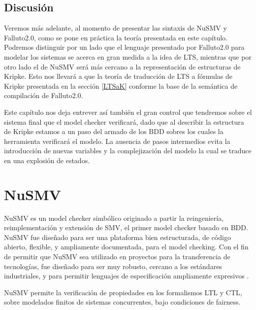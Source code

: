 \documentclass[pdftex,a4paper,12pt]{book}
\begin{document}
\section{Discusi\'on}
Veremos m\'as adelante, al momento de presentar las sintaxis de NuSMV y Falluto2.0, como se pone en pr\'actica la teor\'ia presentada en este cap\'itulo. Podremos distinguir por un lado que el lenguaje presentado por Falluto2.0 para modelar los sistemas se acerca en gran medida a la idea de LTS, mientras que por otro lado el de NuSMV ser\'a m\'as cercano a la representaci\'on de estructuras de Kripke. Esto nos llevar\'a a que la teor\'ia de traducci\'on de LTS a f\'ormulas de Kripke presentada en la secci\'on \ref{LTSaK} conforme la base de la sem\'antica de compilaci\'on de Falluto2.0.
 
Este cap\'itulo nos deja entrever as\'i tambi\'en el gran control que tendremos sobre el sistema final que el model checker verificar\'a, dado que al describir la estructura de Kripke estamos a un paso del armado de los BDD sobres los cuales la herramienta verificar\'a el modelo. La ausencia de pasos intermedios evita la introducci\'on de nuevas variables y la complejizaci\'on del modelo la cual se traduce en una explosi\'on de estados.







\chapter{NuSMV}
\label{CapNuSMV}

NuSMV es un model checker simb\'olico originado a partir la reingenier\'ia, reimplementaci\'on y extensi\'on de SMV, el primer model checker basado en BDD. NuSMV fue dise\~nado para ser una plataforma bien estructurada, de c\'odigo abierto, flexible, y ampliamente documentada, para el model checking. Con el fin de permitir que NuSMV sea utilizado en proyectos para la transferencia de tecnolog\'ias, fue dise\~nado para ser muy robusto, cercano a los est\'andares industriales, y para permitir lenguajes de especificaci\'on ampliamente expresivos \cite{Cimatti}.

NuSMV permite la verificaci\'on de propiedades en los formalismos LTL y CTL, sobre modelados finitos de sistemas concurrentes, bajo condiciones de fairness.
\end{document}
